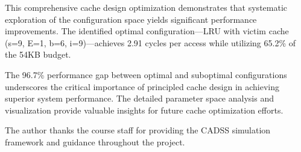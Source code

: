 \documentclass[sigconf,nonacm,natbib=false]{acmart}
\begin{document}
This comprehensive cache design optimization demonstrates that systematic exploration of the configuration space yields significant performance improvements. The identified optimal configuration—LRU with victim cache (s=9, E=1, b=6, i=9)—achieves 2.91 cycles per access while utilizing 65.2\% of the 54KB budget.

The 96.7\% performance gap between optimal and suboptimal configurations underscores the critical importance of principled cache design in achieving superior system performance. The detailed parameter space analysis and visualization provide valuable insights for future cache optimization efforts.

\begin{acks}
The author thanks the course staff for providing the CADSS simulation framework and guidance throughout the project.
\end{acks}

\printbibliography
\end{document}
